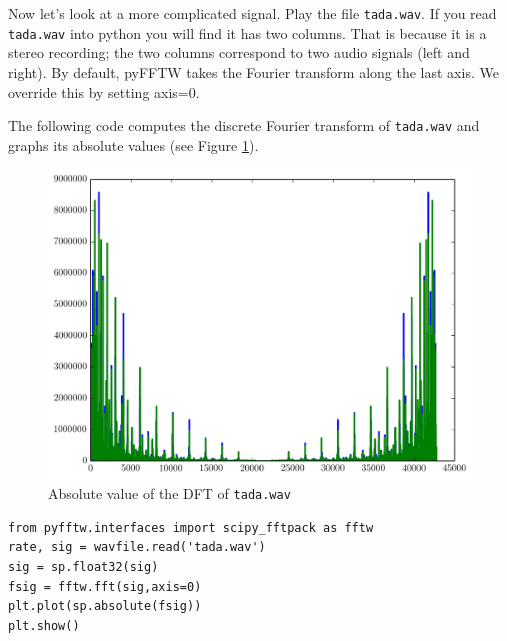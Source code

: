 Now let's look at a more complicated signal. Play the file \texttt{tada.wav}.
If you read \texttt{tada.wav} into python you will find it has two columns.
That is because it is a stereo recording; the two columns correspond to two audio signals (left and right).
By default, pyFFTW takes the Fourier transform along the last axis. We override this by setting axis=0.

The following code computes the discrete Fourier transform of \texttt{tada.wav} and graphs its absolute values (see Figure \ref{tadaspec}).

\begin{figure}[ht]\caption{Absolute value of the DFT of \texttt{tada.wav}}\label{tadaspec}\centering\includegraphics[width=\textwidth]{tadaspec}\end{figure}

\begin{lstlisting}
from pyfftw.interfaces import scipy_fftpack as fftw
rate, sig = wavfile.read('tada.wav')
sig = sp.float32(sig)
fsig = fftw.fft(sig,axis=0)
plt.plot(sp.absolute(fsig))
plt.show()
\end{lstlisting}


